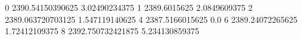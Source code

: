 0 2390.54150390625 3.02490234375
1 2389.6015625 2.0849609375
2 2389.063720703125 1.547119140625
4 2387.5166015625 0.0
6 2389.24072265625 1.72412109375
8 2392.750732421875 5.234130859375
